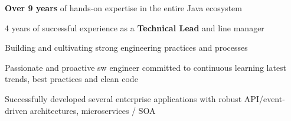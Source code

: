 

\begin{cvparagraph}

    \vspace{10pt}
    \begin{cvitems} %
        \item {\textbf{Over 9 years} of hands-on expertise in the entire Java ecosystem}
        \item {4 years of successful experience as a \textbf{Technical Lead} and line manager}
        \item {Building and cultivating strong engineering practices and processes}
        \item {Passionate and proactive sw engineer committed to continuous learning latest trends, best practices and clean code}
        \item {Successfully developed several enterprise applications with robust API/event-driven architectures, microservices / SOA}
    \end{cvitems}
\end{cvparagraph}
